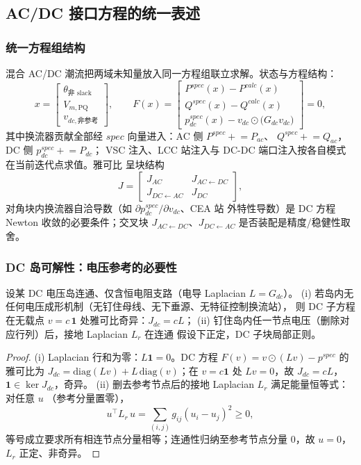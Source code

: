 \subsection{AC/DC 接口方程的统一表述}\label{sec:pf-th-vs-unified}

\subsubsection{统一方程组结构}
混合 AC/DC 潮流把两域未知量放入同一方程组联立求解。状态与方程结构：
\begin{equation}
x=\begin{bmatrix}\theta_{\text{非 slack}}\\ V_{m,\mathrm{PQ}}\\ v_{dc,\text{非参考}}\end{bmatrix},
\qquad
F(x)=\begin{bmatrix}
P^{spec}(x)-P^{calc}(x)\\
Q^{spec}(x)-Q^{calc}(x)\\
p_{dc}^{spec}(x)-v_{dc}\odot\bigl(G_{dc}v_{dc}\bigr)
\end{bmatrix}=0,
\end{equation}
其中换流器贡献全部经 $spec$ 向量进入：AC 侧 $P^{spec}\mathrel{+}=P_{ac}$、
$Q^{spec}\mathrel{+}=Q_{ac}$，DC 侧 $p_{dc}^{spec}\mathrel{+}=P_{dc}$；
VSC 注入、LCC 站注入与 DC-DC 端口注入按各自模式在当前迭代点求值。雅可比
呈块结构
\begin{equation}
J=\begin{bmatrix}
J_{AC} & J_{AC\leftarrow DC}\\
J_{DC\leftarrow AC} & J_{DC}
\end{bmatrix},
\end{equation}
对角块内换流器自洽导数（如 $\partial p_{dc}^{spec}/\partial v_{dc}$、CEA 站
外特性导数）是 DC 方程 Newton 收敛的必要条件；交叉块
$J_{AC\leftarrow DC}$、$J_{DC\leftarrow AC}$ 是否装配是精度/稳健性取舍。

\subsubsection{DC 岛可解性：电压参考的必要性}
\begin{theorem}[DC 岛电压参考条件]\label{thm:pf-th-vs-dcref}
设某 DC 电压岛连通、仅含恒电阻支路（电导 Laplacian $L=G_{dc}$）。
(i) 若岛内无任何电压成形机制（无钉住母线、无下垂源、无特征控制换流站），
则 DC 子方程在无载点 $v=c\,\mathbf 1$ 处雅可比奇异：$J_{dc}=cL$；
(ii) 钉住岛内任一节点电压（删除对应行列）后，接地 Laplacian $L_r$ 在连通
假设下正定，DC 子块局部正则。
\end{theorem}
\begin{proof}
(i) Laplacian 行和为零：$L\mathbf1=0$。DC 方程
$F(v)=v\odot(Lv)-p^{spec}$ 的雅可比为
$J_{dc}=\mathrm{diag}(Lv)+L\,\mathrm{diag}(v)$；在 $v=c\mathbf1$ 处
$Lv=0$，故 $J_{dc}=cL$，$\mathbf1\in\ker J_{dc}$，奇异。
(ii) 删去参考节点后的接地 Laplacian $L_r$ 满足能量恒等式：对任意 $u$
（参考分量置零），
\begin{equation}
u^{\top}L_r\,u=\sum_{(i,j)}g_{ij}(u_i-u_j)^{2}\ge0,
\end{equation}
等号成立要求所有相连节点分量相等；连通性归纳至参考节点分量 $0$，故
$u=0$，$L_r$ 正定、非奇异。
\end{proof}

